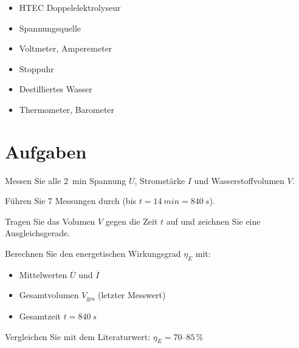 \documentclass[11pt,a4paper]{scrartcl}
\begin{document}
	\begin{materialbox}
		\begin{minipage}{0.48\textwidth}
			\begin{itemize}
				\item HTEC Doppelelektrolyseur
				\item Spannungsquelle
				\item Voltmeter, Amperemeter
			\end{itemize}
		\end{minipage}
		\begin{minipage}{0.48\textwidth}
			\begin{itemize}
				\item Stoppuhr
				\item Destilliertes Wasser
				\item Thermometer, Barometer
			\end{itemize}
		\end{minipage}
	\end{materialbox}
	
	\section*{Aufgaben}
	
	\begin{aufgabe}[title={\faIcon{pencil-alt} Aufgabe 1: Messung}]
		Messen Sie alle \SI{2}{min} Spannung $U$, Stromstärke $I$ und Wasserstoffvolumen $V$.
		
		Führen Sie 7 Messungen durch (bis $t = \SI{14}{min} = \SI{840}{s}$).
	\end{aufgabe}
	
	\begin{aufgabe}[title={\faIcon{pencil-alt} Aufgabe 2: Diagramm}]
		Tragen Sie das Volumen $V$ gegen die Zeit $t$ auf und zeichnen Sie eine Ausgleichsgerade.
	\end{aufgabe}
	
	\begin{aufgabe}[title={\faIcon{pencil-alt} Aufgabe 3: Wirkungsgrad berechnen}]
		Berechnen Sie den energetischen Wirkungsgrad $\eta_E$ mit:
		\begin{itemize}
			\item Mittelwerten $\overline{U}$ und $\overline{I}$
			\item Gesamtvolumen $V_{\text{ges}}$ (letzter Messwert)
			\item Gesamtzeit $t = \SI{840}{s}$
		\end{itemize}
		Vergleichen Sie mit dem Literaturwert: $\eta_E = 70$--$85\,\%$
	\end{aufgabe}
	
\end{document}
